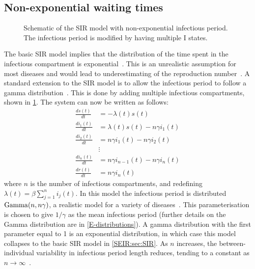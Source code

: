 \documentclass[thesis.tex]{subfiles}
\begin{document}
\subsection{Non-exponential waiting times} \label{SEIR:sec:non-exponential}
\begin{figure}[h]
  \caption[The SIR model with non-exponential infectious period]{Schematic of the SIR model with non-exponential infectious period. The infectious period is modified by having multiple I states.}
  \label{SEIR:fig:SIR-gamma}
\end{figure}

The basic SIR model implies that the distribution of the time spent in the infectious compartment is exponential~\autocite[96]{keelingModeling}.
This is an unrealistic assumption for most diseases and would lead to underestimating of the reproduction number~\autocites{lloydRealistic}{wearingAppropriate}.
A standard extension to the SIR model is to allow the infectious period to follow a gamma distribution~\autocite[94]{keelingModeling}.
This is done by adding multiple infectious compartments, shown in \cref{SEIR:fig:SIR-gamma}.
The system can now be written as follows:
\begin{align}
\frac{ds(t)}{dt} &= -\lambda(t) s(t)\\
\frac{di_1(t)}{dt} &= \lambda(t) s(t) - n\gamma i_1(t) \\
\frac{di_2(t)}{dt} &= n\gamma i_1(t) - n \gamma i_2(t) \\
&\vdots \nonumber \\
\frac{di_n(t)}{dt} &= n\gamma i_{n-1}(t) - n \gamma i_n(t) \\
\frac{dr(t)}{dt} &= n\gamma i_n(t)
\end{align}
where $n$ is the number of infectious compartments, and redefining $\lambda(t) = \beta \sum_{j=1}^n i_j(t)$.
In this model the infectious period is distributed $\operatorname{Gamma}(n, n\gamma)$, a realistic model for a variety of diseases~\autocite{wearingAppropriate}.
This parameterisation is chosen to give $1/\gamma$ as the mean infectious period (further details on the Gamma distribution are in \cref{E-distributions}).
A gamma distribution with the first parameter equal to 1 is an exponential distribution, in which case this model collapses to the basic SIR model in \cref{SEIR:sec:SIR}.
As $n$ increases, the between-individual variability in infectious period length reduces, tending to a constant as $n \to \infty$~\autocite{lloydRealistic}.
\end{document}
